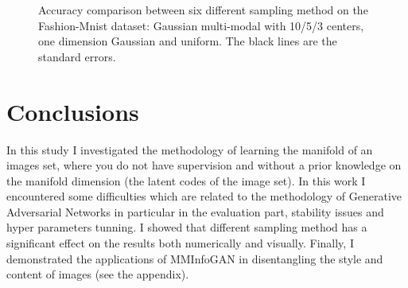 \documentclass[letterpaper,12pt]{article}
\begin{document}
\begin{figure}[H]
\centering
\caption{\label{plot_results} Accuracy comparison between six different sampling method on the Fashion-Mnist dataset: Gaussian multi-modal with 10/5/3 centers, one dimension Gaussian and uniform. The black lines are the standard errors.}
\end{figure}

\section{Conclusions}
In this study I investigated the methodology of learning the manifold of an images set, where you do not have supervision and without a prior knowledge on the manifold dimension (the latent codes of the image set). In this work I encountered some difficulties which are related to the methodology of Generative Adversarial Networks in particular in the evaluation part, stability issues and hyper parameters tunning. I showed that different sampling method has a significant effect on the results both numerically and visually. 
Finally, I demonstrated the applications of MMInfoGAN in disentangling the style and content of images (see the appendix).




\newpage

\appendix 
\end{document}
